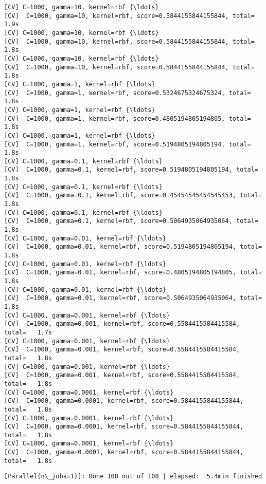 \documentclass[11pt]{article}
\begin{document}
\begin{Verbatim}[commandchars=\\\{\}]
[CV] C=1000, gamma=10, kernel=rbf {\ldots}
[CV]  C=1000, gamma=10, kernel=rbf, score=0.5844155844155844, total=   1.9s
[CV] C=1000, gamma=10, kernel=rbf {\ldots}
[CV]  C=1000, gamma=10, kernel=rbf, score=0.5844155844155844, total=   1.8s
[CV] C=1000, gamma=10, kernel=rbf {\ldots}
[CV]  C=1000, gamma=10, kernel=rbf, score=0.5844155844155844, total=   1.8s
[CV] C=1000, gamma=1, kernel=rbf {\ldots}
[CV]  C=1000, gamma=1, kernel=rbf, score=0.5324675324675324, total=   1.8s
[CV] C=1000, gamma=1, kernel=rbf {\ldots}
[CV]  C=1000, gamma=1, kernel=rbf, score=0.4805194805194805, total=   1.8s
[CV] C=1000, gamma=1, kernel=rbf {\ldots}
[CV]  C=1000, gamma=1, kernel=rbf, score=0.5194805194805194, total=   1.8s
[CV] C=1000, gamma=0.1, kernel=rbf {\ldots}
[CV]  C=1000, gamma=0.1, kernel=rbf, score=0.5194805194805194, total=   1.8s
[CV] C=1000, gamma=0.1, kernel=rbf {\ldots}
[CV]  C=1000, gamma=0.1, kernel=rbf, score=0.45454545454545453, total=   1.8s
[CV] C=1000, gamma=0.1, kernel=rbf {\ldots}
[CV]  C=1000, gamma=0.1, kernel=rbf, score=0.5064935064935064, total=   1.8s
[CV] C=1000, gamma=0.01, kernel=rbf {\ldots}
[CV]  C=1000, gamma=0.01, kernel=rbf, score=0.5194805194805194, total=   1.8s
[CV] C=1000, gamma=0.01, kernel=rbf {\ldots}
[CV]  C=1000, gamma=0.01, kernel=rbf, score=0.4805194805194805, total=   1.8s
[CV] C=1000, gamma=0.01, kernel=rbf {\ldots}
[CV]  C=1000, gamma=0.01, kernel=rbf, score=0.5064935064935064, total=   1.8s
[CV] C=1000, gamma=0.001, kernel=rbf {\ldots}
[CV]  C=1000, gamma=0.001, kernel=rbf, score=0.5584415584415584, total=   1.7s
[CV] C=1000, gamma=0.001, kernel=rbf {\ldots}
[CV]  C=1000, gamma=0.001, kernel=rbf, score=0.5584415584415584, total=   1.8s
[CV] C=1000, gamma=0.001, kernel=rbf {\ldots}
[CV]  C=1000, gamma=0.001, kernel=rbf, score=0.5584415584415584, total=   1.8s
[CV] C=1000, gamma=0.0001, kernel=rbf {\ldots}
[CV]  C=1000, gamma=0.0001, kernel=rbf, score=0.5844155844155844, total=   1.8s
[CV] C=1000, gamma=0.0001, kernel=rbf {\ldots}
[CV]  C=1000, gamma=0.0001, kernel=rbf, score=0.5844155844155844, total=   1.8s
[CV] C=1000, gamma=0.0001, kernel=rbf {\ldots}
[CV]  C=1000, gamma=0.0001, kernel=rbf, score=0.5844155844155844, total=   1.8s

    \end{Verbatim}

    \begin{Verbatim}[commandchars=\\\{\}]
[Parallel(n\_jobs=1)]: Done 108 out of 108 | elapsed:  5.4min finished

    \end{Verbatim}
\end{document}
